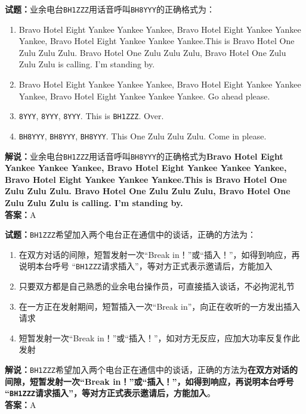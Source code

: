 \documentclass{ctexbook}
\begin{document}
\noindent\textbf{试题：}业余电台\texttt{BH1ZZZ}用话音呼叫\texttt{BH8YYY}的正确格式为：
\begin{enumerate}[leftmargin=3em]
  \item Bravo Hotel Eight Yankee Yankee Yankee, Bravo Hotel Eight Yankee Yankee Yankee, Bravo Hotel Eight Yankee Yankee Yankee.This is Bravo Hotel One Zulu Zulu Zulu. Bravo Hotel One Zulu Zulu Zulu, Bravo Hotel One Zulu Zulu Zulu is calling. I’m standing by.
  \item Bravo Hotel Eight Yankee Yankee Yankee, Bravo Hotel Eight Yankee Yankee Yankee, Bravo Hotel Eight Yankee Yankee Yankee. Go ahead please.
  \item \texttt{8YYY}, \texttt{8YYY}, \texttt{8YYY}. This is \texttt{BH1ZZZ}. Over.
  \item \texttt{BH8YYY}, \texttt{BH8YYY}, \texttt{BH8YYY}. This One Zulu Zulu Zulu. Come in please.
\end{enumerate}
\noindent\textbf{解说：}业余电台\texttt{BH1ZZZ}用话音呼叫\texttt{BH8YYY}的正确格式为\textbf{Bravo Hotel Eight Yankee Yankee Yankee, Bravo Hotel Eight Yankee Yankee Yankee, Bravo Hotel Eight Yankee Yankee Yankee.This is Bravo Hotel One Zulu Zulu Zulu. Bravo Hotel One Zulu Zulu Zulu, Bravo Hotel One Zulu Zulu Zulu is calling. I’m standing by.}\cite{icao}\cite[49]{yeyuwuxiandiantongxin}\\
\noindent\textbf{答案：}A

\bigskip

\noindent\textbf{试题：}\texttt{BH1ZZZ}希望加入两个电台正在通信中的谈话，正确的方法为：
\begin{enumerate}[leftmargin=3em]
  \item 在双方对话的间隙，短暂发射一次“Break in！”或“插入！”，如得到响应，再说明本台呼号 “\texttt{BH1ZZZ}请求插入”，等对方正式表示邀请后，方能加入
  \item 只要双方都是自己熟悉的业余电台操作员，可直接插入谈话，不必拘泥礼节
  \item 在一方正在发射期间，短暂插入一次“Break in”，向正在收听的一方发出插入请求
  \item 短暂发射一次“Break in！”或“插入！”，如对方无反应，应加大功率反复作此发射
\end{enumerate}
\noindent\textbf{解说：}\texttt{BH1ZZZ}希望加入两个电台正在通信中的谈话，正确的方法为\textbf{在双方对话的间隙，短暂发射一次“Break in！”或“插入！”，如得到响应，再说明本台呼号 “\texttt{BH1ZZZ}请求插入”，等对方正式表示邀请后，方能加入}。\\
\noindent\textbf{答案：}A
\end{document}
